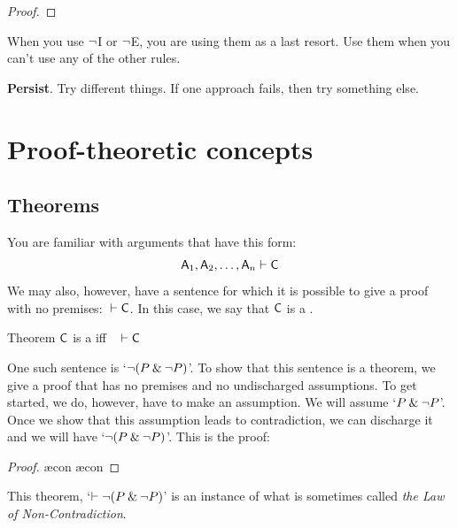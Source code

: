 \begin{earg}
\begin{proof}
	 \pr{}
	\open
		\as{}
	\close
	\ci{}
\end{proof}

\medskip

\item[\ex{18-7}] When you use ${\neg}$I or ${\neg}$E, you are using them as a last resort. Use them when you can't use any of the other rules.
\medskip

\item[\ex{18-8}] \textbf{Persist}. Try different things. If one approach fails, then try something else.
\end{earg}




\chapter{Proof-theoretic concepts}\label{s:ProofTheoreticConcepts}

\section{Theorems}\label{s:theorems}

You are familiar with arguments that have this form:
$$\mathsf{A}_1, \mathsf{A}_2, \ldots, \mathsf{A}_n \vdash \mathsf{C}$$
We may also, however, have a sentence for which it is possible to give a proof with no premises: ${} \vdash \mathsf{C}$. In this case, we say that $\mathsf{C}$ is a .

\begin{factboxy}{Theorem}\label{def:syntactic_tautology_in_sl}
$\mathsf{C}$ is a  iff ~ $\vdash \mathsf{C}$
\end{factboxy}

One such sentence is `${\neg} (P \mathbin{\&} {\neg} P)$'. To show that this sentence is a theorem, we give a proof that has no premises and no undischarged assumptions. To get started, we do, however, have to make an assumption. We will assume `$P \mathbin{\&} {\neg} P$'. Once we show that this assumption leads to contradiction, we can discharge it and we will have `${\neg} (P \mathbin{\&} {\neg} P)$'. This is the proof:
	\begin{proof}
		\open
			\ae{con}
			\ae{con}
		\close
	\end{proof}
This theorem, `$\vdash {\neg} (P \mathbin{\&} {\neg} P)$' is an instance of what is sometimes called \emph{the Law of Non-Contradiction}.

